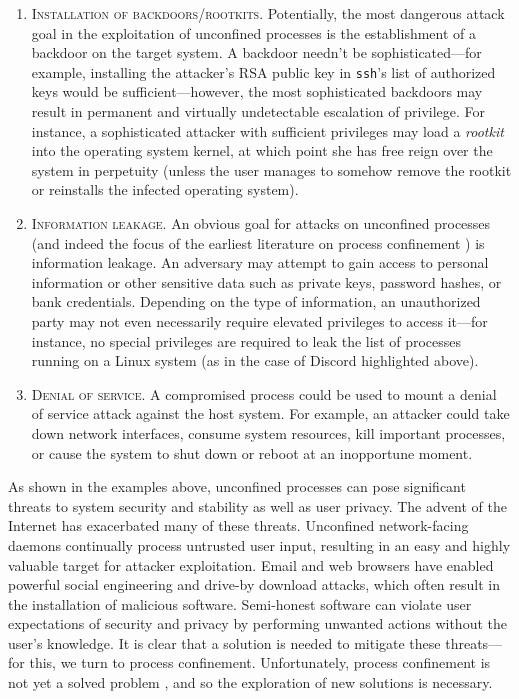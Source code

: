 \documentclass[dvipsnames, 12pt]{article}
\begin{document}
\begin{enumerate}[label=\bfseries G\arabic*., ref=G\arabic*, labelindent=2em]
    \item \label{g:1} \textsc{Installation of backdoors/rootkits.} Potentially,
    the most dangerous attack goal in the exploitation of unconfined processes
    is the establishment of a backdoor on the target system.  A backdoor needn't
    be sophisticated---for example, installing the attacker's RSA public key in
    \texttt{ssh}'s list of authorized keys would be sufficient---however, the
    most sophisticated backdoors may result in permanent and virtually
    undetectable escalation of privilege. For instance, a sophisticated attacker
    with sufficient privileges may load a \textit{rootkit}
    \cite{beegle2007_rootkit} into the operating system kernel, at which point
    she has free reign over the system in perpetuity (unless the user manages
    to somehow remove the rootkit or reinstalls the infected operating system).

    \item \label{g:2} \textsc{Information leakage.} An obvious goal for attacks
    on unconfined processes (and indeed the focus of the earliest literature on
    process confinement \cite{lampson1973_a_note}) is information leakage. An
    adversary may attempt to gain access to personal information or other
    sensitive data such as private keys, password hashes, or bank credentials.
    Depending on the type of information, an unauthorized party may not even
    necessarily require elevated privileges to access it---for instance, no
    special privileges are required to leak the list of processes running on
    a Linux system (as in the case of Discord \cite{discord} highlighted above).

    \item \label{g:3} \textsc{Denial of service.} A compromised process could be
    used to mount a denial of service attack against the host system. For
    example, an attacker could take down network interfaces, consume system
    resources, kill important processes, or cause the system to shut down or
    reboot at an inopportune moment.
\end{enumerate}

As shown in the examples above, unconfined processes can pose significant
threats to system security and stability as well as user privacy. The advent of
the Internet has exacerbated many of these threats. Unconfined network-facing
daemons continually process untrusted user input, resulting in an easy and
highly valuable target for attacker exploitation. Email and web browsers have
enabled powerful social engineering and drive-by download attacks, which often
result in the installation of malicious software. Semi-honest software can
violate user expectations of security and privacy by performing unwanted actions
without the user's knowledge. It is clear that a solution is needed to mitigate
these threats---for this, we turn to process confinement.  Unfortunately,
process confinement is not yet a solved problem
\cite{crowell2013_confinement_problem}, and so the exploration of new solutions
is necessary.
\end{document}
